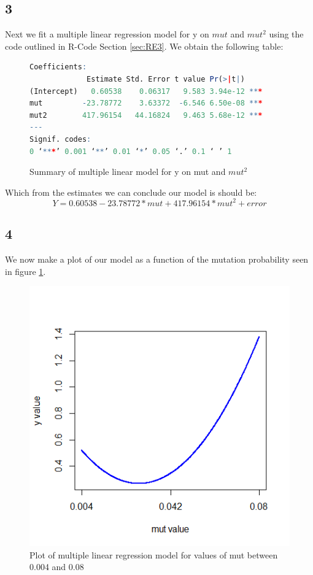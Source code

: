 \documentclass{article}
\begin{document}
    \subsection*{3}
    Next we fit a multiple linear regression model for y on $mut$ and $mut^2$ using the code outlined in R-Code Section \ref{sec:RE3}. We obtain the following table:
    \begin{figure}[H]
    \begin{lstlisting}[language=R]
Coefficients:
             Estimate Std. Error t value Pr(>|t|)    
(Intercept)   0.60538    0.06317   9.583 3.94e-12 ***
mut         -23.78772    3.63372  -6.546 6.50e-08 ***
mut2        417.96154   44.16824   9.463 5.68e-12 ***
---
Signif. codes:  
0 ‘***’ 0.001 ‘**’ 0.01 ‘*’ 0.05 ‘.’ 0.1 ‘ ’ 1    
    \end{lstlisting}
    \caption{Summary of multiple linear model for y on mut and $mut^2$}
    \end{figure}
    
    Which from the estimates we can conclude our model is should be:
    $$Y = 0.60538 - 23.78772*mut + 417.96154*mut^2 + error$$
    \subsection*{4}
    
    We now make a plot of our model as a function of the mutation probability seen in figure \ref{PlotMut}.
        \begin{figure}[H]
    	\centering
    	\includegraphics[scale=0.6]{../results/3_4.png}
    	\caption{Plot of multiple linear regression model for values of mut between 0.004 and 0.08}
    	\label{PlotMut}
    	\end{figure}    
    
\end{document}
